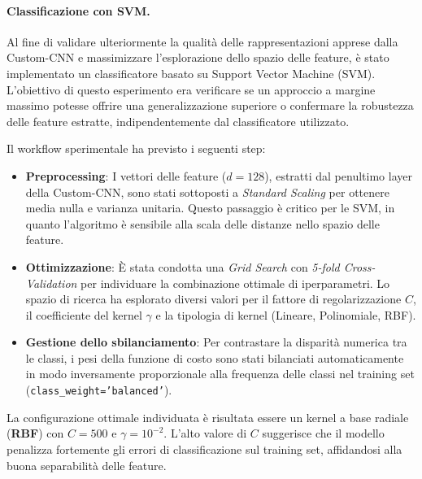 \paragraph{Classificazione con SVM.}
Al fine di validare ulteriormente la qualità delle rappresentazioni apprese dalla Custom-CNN e massimizzare l'esplorazione dello spazio delle feature, è stato implementato un classificatore basato su Support Vector Machine (SVM). L'obiettivo di questo esperimento era verificare se un approccio a margine massimo potesse offrire una generalizzazione superiore o confermare la robustezza delle feature estratte, indipendentemente dal classificatore utilizzato.

Il workflow sperimentale ha previsto i seguenti step:
\begin{itemize}
    \item \textbf{Preprocessing}: I vettori delle feature ($d=128$), estratti dal penultimo layer della Custom-CNN, sono stati sottoposti a \textit{Standard Scaling} per ottenere media nulla e varianza unitaria. Questo passaggio è critico per le SVM, in quanto l'algoritmo è sensibile alla scala delle distanze nello spazio delle feature.
    \item \textbf{Ottimizzazione}: È stata condotta una \textit{Grid Search} con \textit{5-fold Cross-Validation} per individuare la combinazione ottimale di iperparametri. Lo spazio di ricerca ha esplorato diversi valori per il fattore di regolarizzazione $C$, il coefficiente del kernel $\gamma$ e la tipologia di kernel (Lineare, Polinomiale, RBF).
    \item \textbf{Gestione dello sbilanciamento}: Per contrastare la disparità numerica tra le classi, i pesi della funzione di costo sono stati bilanciati automaticamente in modo inversamente proporzionale alla frequenza delle classi nel training set (\texttt{class\_weight='balanced'}).
\end{itemize}

La configurazione ottimale individuata è risultata essere un kernel a base radiale (\textbf{RBF}) con $C=500$ e $\gamma=10^{-2}$. L'alto valore di $C$ suggerisce che il modello penalizza fortemente gli errori di classificazione sul training set, affidandosi alla buona separabilità delle feature.


